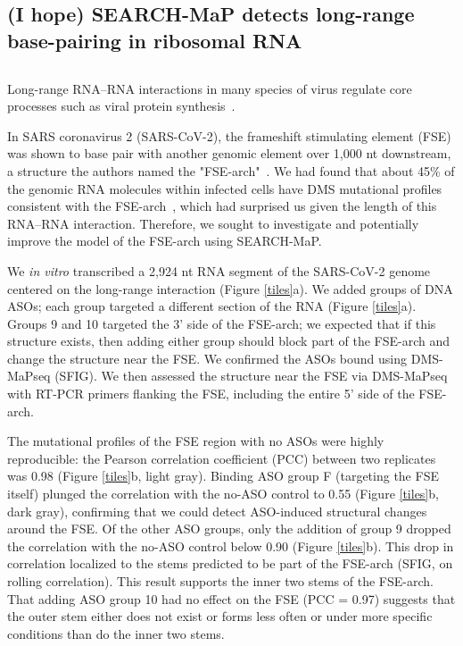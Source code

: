 \documentclass[main.tex]{subfiles}
\begin{document}
\subsection{(I hope) SEARCH-MaP detects long-range base-pairing in ribosomal RNA}


\subsection{}

Long-range RNA--RNA interactions in many species of virus regulate core processes such as viral protein synthesis~\cite{Nicholson2014}.

In SARS coronavirus 2 (SARS-CoV-2), the frameshift stimulating element (FSE) was shown to base pair with another genomic element over 1,000 nt downstream, a structure the authors named the "FSE-arch"~\cite{Ziv2020}.
We had found that about 45\% of the genomic RNA molecules within infected cells have DMS mutational profiles consistent with the FSE-arch~\cite{Lan2022}, which had surprised us given the length of this RNA--RNA interaction.
Therefore, we sought to investigate and potentially improve the model of the FSE-arch using SEARCH-MaP.

We \textit{in vitro} transcribed a 2,924 nt RNA segment of the SARS-CoV-2 genome centered on the long-range interaction (Figure \ref{tiles}a).
We added groups of DNA ASOs; each group targeted a different section of the RNA (Figure \ref{tiles}a).
Groups 9 and 10 targeted the 3' side of the FSE-arch; we expected that if this structure exists, then adding either group should block part of the FSE-arch and change the structure near the FSE.
We confirmed the ASOs bound using DMS-MaPseq (SFIG).
We then assessed the structure near the FSE via DMS-MaPseq with RT-PCR primers flanking the FSE, including the entire 5' side of the FSE-arch.

The mutational profiles of the FSE region with no ASOs were highly reproducible: the Pearson correlation coefficient (PCC) between two replicates was 0.98 (Figure \ref{tiles}b, light gray).
Binding ASO group F (targeting the FSE itself) plunged the correlation with the no-ASO control to 0.55 (Figure \ref{tiles}b, dark gray), confirming that we could detect ASO-induced structural changes around the FSE.
Of the other ASO groups, only the addition of group 9 dropped the correlation with the no-ASO control below 0.90 (Figure \ref{tiles}b).
This drop in correlation localized to the stems predicted to be part of the FSE-arch (SFIG, on rolling correlation).
This result supports the inner two stems of the FSE-arch.
That adding ASO group 10 had no effect on the FSE (PCC = 0.97) suggests that the outer stem either does not exist or forms less often or under more specific conditions than do the inner two stems.
\end{document}
